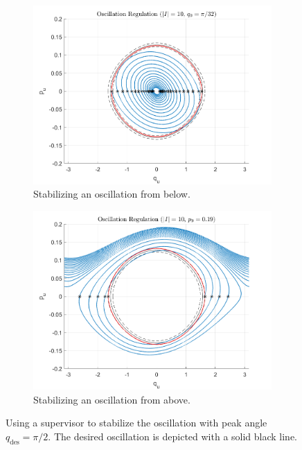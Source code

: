 \documentclass[journal,twoside,onecolumn,draftclsnofoot,web]{ieeecolor}
\begin{document}
{\begin{figure}
    \centering
    \begin{subfigure}[t]{0.49\linewidth}
        \includegraphics[width=\linewidth]{acrobot_osc_orbit_1.png}
        \caption{Stabilizing an oscillation from below.}
        \label{fig:acrobot-osc-reg-in}
    \end{subfigure}
    \begin{subfigure}[t]{0.49\linewidth}
        \includegraphics[width=\linewidth]{acrobot_osc_orbit_2.png}
        \caption{Stabilizing an oscillation from above.}
        \label{fig:acrobot-osc-reg-diss}
    \end{subfigure}
    \caption{Using a supervisor to stabilize the oscillation with peak angle
    \(q_\text{des} = \pi/2\). The desired oscillation is depicted with a solid
    black line.}
    \label{fig:acrobot-osc-reg}
\end{figure}

}
\end{document}
